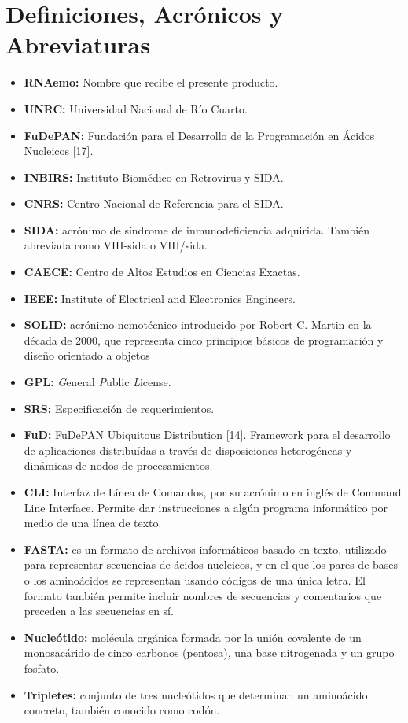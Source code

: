 \section{Definiciones, Acrónicos y Abreviaturas}
\label{appendix-acro}
\begin{itemize}
	\item \textbf{RNAemo:} Nombre que recibe el presente producto.
	\item \textbf{UNRC:} Universidad Nacional de Río Cuarto.
	\item \textbf{FuDePAN:} Fundación para el Desarrollo de la Programación en Ácidos Nucleicos [17].
	\item \textbf{INBIRS:} Instituto Biomédico en Retrovirus y SIDA.
	\item \textbf{CNRS:} Centro Nacional de Referencia para el SIDA.
	\item \textbf{SIDA:} acrónimo de síndrome de inmunodeficiencia adquirida. También abreviada como VIH-sida o VIH/sida.
	\item \textbf{CAECE:} Centro de Altos Estudios en Ciencias Exactas.
	\item \textbf{IEEE:} Institute of Electrical and Electronics Engineers.
	\item \textbf{SOLID:} acrónimo nemotécnico introducido por Robert C. Martin en la
							década de 2000, que representa cinco principios básicos de programación
							y diseño orientado a objetos
	\item \textbf{GPL:} \textit{G}eneral \textit{P}ublic \textit{L}icense.	
	\item \textbf{SRS:} Especificación de requerimientos.
	\item \textbf{FuD:} FuDePAN Ubiquitous Distribution [14]. Framework para el desarrollo de aplicaciones distribuídas a través de disposiciones 							heterogéneas y dinámicas de nodos de procesamientos.
	\item \textbf{CLI:} Interfaz de Línea de Comandos, por su acrónimo en inglés de Command Line Interface. Permite dar instrucciones a algún programa 							informático por medio de una línea de texto.
	\item \textbf{FASTA:} es un formato de archivos informáticos basado en texto, utilizado para representar secuencias de ácidos nucleicos, y en el que 							  los pares de bases o los aminoácidos se representan usando códigos de una única letra. El formato también permite incluir nombres 						  de secuencias y comentarios que preceden a las secuencias en sí.
	\item \textbf{Nucleótido:} molécula orgánica formada por la unión covalente de un monosacárido de cinco carbonos (pentosa), una base nitrogenada y un 								   grupo fosfato.
	\item \textbf{Tripletes:} conjunto de tres nucleótidos que determinan un aminoácido concreto, también conocido como codón.


\end{itemize}
